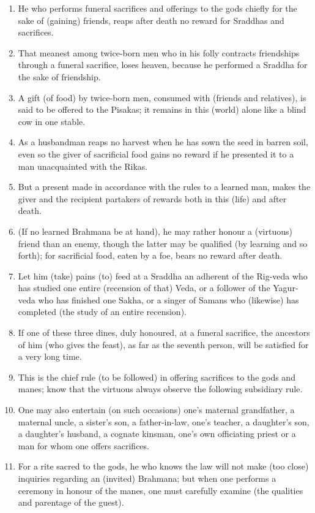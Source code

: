 \begin{enumerate}
\item He who performs funeral sacrifices and offerings to the gods chiefly for the sake of (gaining) friends, reaps after death no reward for Sraddhas and sacrifices.
\item That meanest among twice-born men who in his folly contracts friendships through a funeral sacrifice, loses heaven, because he performed a Sraddha for the sake of friendship.
\item A gift (of food) by twice-born men, consumed with (friends and relatives), is said to be offered to the Pisakas; it remains in this (world) alone like a blind cow in one stable.
\item As a husbandman reaps no harvest when he has sown the seed in barren soil, even so the giver of sacrificial food gains no reward if he presented it to a man unacquainted with the Rikas.
\item But a present made in accordance with the rules to a learned man, makes the giver and the recipient partakers of rewards both in this (life) and after death.
\item (If no learned Brahmana be at hand), he may rather honour a (virtuous) friend than an enemy, though the latter may be qualified (by learning and so forth); for sacrificial food, eaten by a foe, bears no reward after death.
\item Let him (take) pains (to) feed at a Sraddha an adherent of the Rig-veda who has studied one entire (recension of that) Veda, or a follower of the Yagur-veda who has finished one Sakha, or a singer of Samans who (likewise) has completed (the study of an entire recension).
\item If one of these three dines, duly honoured, at a funeral sacrifice, the ancestors of him (who gives the feast), as far as the seventh person, will be satisfied for a very long time.
\item This is the chief rule (to be followed) in offering sacrifices to the gods and manes; know that the virtuous always observe the following subsidiary rule.
\item One may also entertain (on such occasions) one's maternal grandfather, a maternal uncle, a sister's son, a father-in-law, one's teacher, a daughter's son, a daughter's husband, a cognate kinsman, one's own officiating priest or a man for whom one offers sacrifices.
\item For a rite sacred to the gods, he who knows the law will not make (too close) inquiries regarding an (invited) Brahmana; but when one performs a ceremony in honour of the manes, one must carefully examine (the qualities and parentage of the guest).

\end{enumerate}
